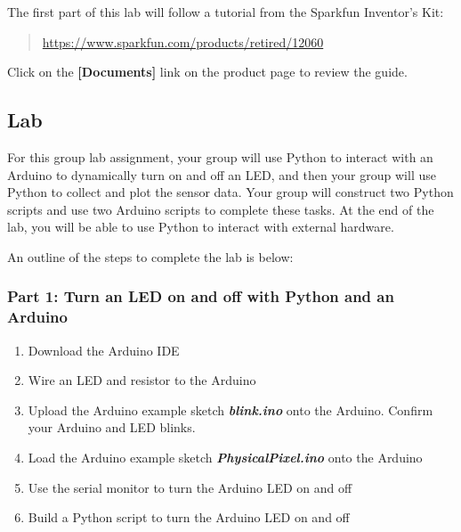 The first part of this lab will follow a tutorial from the Sparkfun
Inventor's Kit:

\begin{quote}
\href{https://www.sparkfun.com/products/retired/12060}{https://www.sparkfun.com/products/retired/12060}
\end{quote}

Click on the \textbf{{[}Documents{]}} link on the product page to review
the guide.

\newpage

    \hypertarget{lab}{%
\subsection{Lab}\label{lab}}

For this group lab assignment, your group will use Python to interact
with an Arduino to dynamically turn on and off an LED, and then your
group will use Python to collect and plot the sensor data. Your group
will construct two Python scripts and use two Arduino scripts to
complete these tasks. At the end of the lab, you will be able to use
Python to interact with external hardware.

    An outline of the steps to complete the lab is below:

\hypertarget{part-1-turn-an-led-on-and-off-with-python-and-an-arduino}{%
\subsubsection{Part 1: Turn an LED on and off with Python and an
Arduino}\label{part-1-turn-an-led-on-and-off-with-python-and-an-arduino}}

\begin{enumerate}
\def\labelenumi{(\alph{enumi})}
\item
  Download the Arduino IDE
\item
  Wire an LED and resistor to the Arduino
\item
  Upload the Arduino example sketch \textbf{\emph{blink.ino}} onto the
  Arduino. Confirm your Arduino and LED blinks.
\item
  Load the Arduino example sketch \textbf{\emph{PhysicalPixel.ino}} onto
  the Arduino
\item
  Use the serial monitor to turn the Arduino LED on and off
\item
  Build a Python script to turn the Arduino LED on and off
\end{enumerate}

